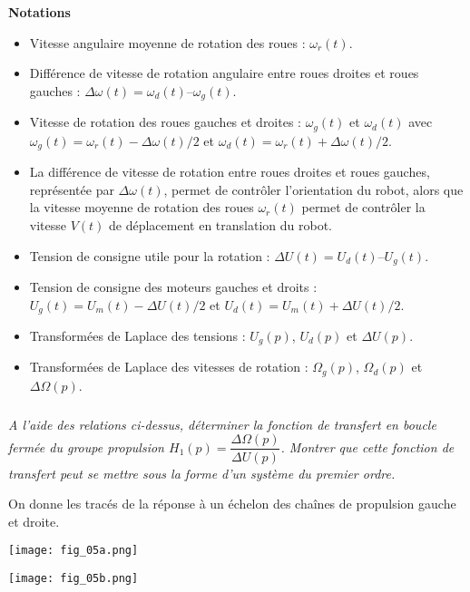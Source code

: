 \begin{multicols}{2}
\textbf{Notations}
\begin{itemize}
\item Vitesse angulaire moyenne de rotation des roues : $\omega_r (t)$. 
\item Différence de vitesse de rotation angulaire entre roues droites et roues gauches : $\Delta\omega(t) = \omega_d (t) – \omega_g (t)$.
\item Vitesse de rotation des roues gauches et droites : $\omega_g (t)$ et $\omega_d (t)$ avec $\omega_g (t)  = \omega_r (t)  - \Delta \omega(t)/2$  et $\omega_d (t)  = \omega_r (t)  + \Delta\omega(t)/2$. 
\item La différence de vitesse de rotation entre roues droites et roues gauches, représentée par $\Delta \omega(t)$, permet de contrôler l’orientation du robot, alors que la vitesse moyenne de rotation des roues $\omega_r (t)$  permet de contrôler la vitesse $V(t)$ de déplacement en translation du robot. 
\item Tension de consigne utile pour la rotation : $\Delta U(t)  = U_d (t)  – U_g (t)$. 
\item Tension de consigne des moteurs gauches et droits :
$U_g(t)=U_m (t)-\Delta U(t)/2$
et $U_d (t)=U_m (t)+\Delta U(t)/2$. 
\item Transformées de Laplace des tensions : $U_g (p)$, $U_d (p)$ et $\Delta U(p)$. 
\item Transformées de Laplace des vitesses de rotation : $\Omega_g (p)$, $\Omega_d (p)$ et $\Delta \Omega(p)$. 
\end{itemize}
\fi


\subparagraph{}
\textit{A l’aide des relations ci-dessus, déterminer la fonction de transfert en boucle fermée du groupe propulsion 
$H_1(p)=\dfrac{\Delta\Omega(p)}{\Delta U(p)}$. 
Montrer que cette fonction de transfert peut se mettre sous la forme d’un système du premier ordre.}
\ifprof
\begin{corrige}
\end{corrige}
\else
\fi

\ifprof
\else
On donne les tracés de la réponse à un échelon des chaînes de propulsion gauche et droite.  

\begin{center}
\texttt{[image: fig\_05a.png]}
\end{center}

\begin{center}
\texttt{[image: fig\_05b.png]}
\end{center}
\fi



\end{multicols}

